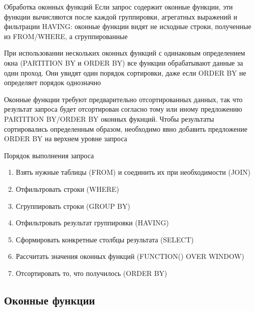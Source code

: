 \documentclass[12pt]{article}
\begin{document}
\begin{nota}{Обработка оконных функций}
    Если запрос содержит оконные функции, эти функции вычисляются после каждой группировки, агрегатных выражений и фильтрации HAVING: оконные функции видят не исходные строки, полученные из FROM/WHERE, а сгруппированные 

    При использовании нескольких оконных функций с одинаковым определением окна (PARTITION BY и ORDER BY) все функции обрабатывают данные за один проход. Они увидят один порядок сортировки, даже если ORDER BY не определяет порядок однозначно 

    Оконные функции требуют предварительно отсортированных данных, так что результат запроса будет отсортирован согласно тому или иному предложению PARTITION BY/ORDER BY оконных фукнций. Чтобы результаты сортировались определенным образом, необходимо явно добавить предложение ORDER BY на верхнем уровне запроса 
\end{nota}

\begin{nota}{Порядок выполнения запроса}
    \begin{enumerate}
        \item Взять нужные таблицы (FROM) и соединить их при необходимости (JOIN)
        \item Отфильтровать строки (WHERE)
        \item Сгруппировать строки (GROUP BY)
        \item Отфильтровать результат группировки (HAVING)
        \item Сформировать конкретные столбцы результата (SELECT)
        \item Рассчитать значения оконных функций (FUNCTION() OVER WINDOW)
        \item Отсортировать то, что получилось (ORDER BY)
    \end{enumerate}
\end{nota}

\newpage 

\subsection{Оконные функции}
\end{document}
